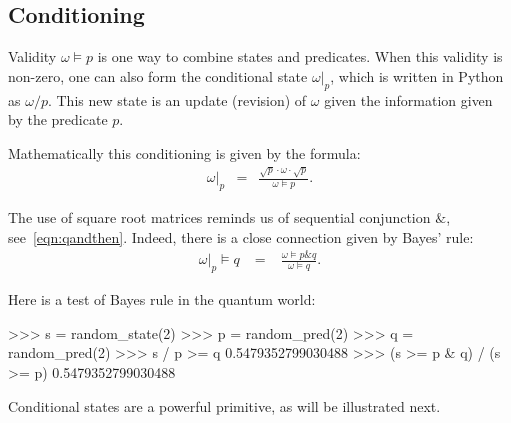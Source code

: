 \documentclass[leqno]{tufte-book} %
\newcommand{\Python}{\textrm{Python}\xspace}
\newcommand{\andthen}{\mathrel{\&}}
\begin{document}
\subsection{Conditioning}\label{subsec:qpred:conditioning}

Validity $\omega\models p$ is one way to combine states and
predicates. When this validity is non-zero, one can also form the
conditional state $\omega|_{p}$,
which is written in \Python as $\omega/p$. This new state is an update
(revision) of $\omega$ given the information given by the predicate
$p$.

Mathematically this conditioning is given by the formula:
\begin{equation}
\label{eqn:qconditiong}
\begin{array}{rcl}
\omega|_{p}
& = &
\displaystyle\frac{\sqrt{p} \cdot \omega \cdot \sqrt{p}}{\omega\models p}.
\end{array}
\end{equation}

\noindent The use of square root matrices reminds us of sequential
conjunction $\andthen$, see~\eqref{eqn:qandthen}. Indeed, there is a
close connection given by Bayes' rule:
\begin{equation}
\label{eqn:qbayes}
\begin{array}{rcl}
\omega|_{p} \models q
& \;=\; &
\displaystyle\frac{\omega\models p\andthen q}{\omega\models q}.
\end{array}
\end{equation}

\noindent Here is a test of Bayes rule in the quantum world:
\begin{python}
>>> s = random_state(2)
>>> p = random_pred(2)
>>> q = random_pred(2)
>>> s / p >= q
0.5479352799030488
>>> (s >= p & q) / (s >= p)
0.5479352799030488
\end{python}

\noindent Conditional states are a powerful primitive, as will
be illustrated next.
\end{document}
